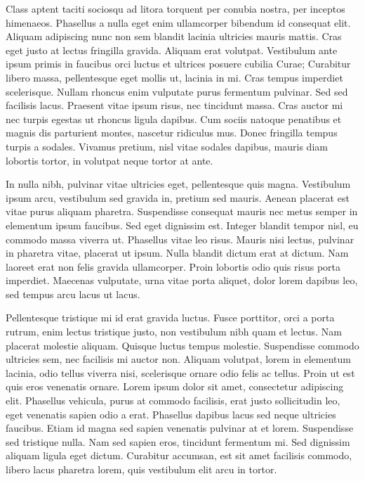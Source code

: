 Class aptent taciti sociosqu ad litora torquent per conubia nostra, per inceptos himenaeos. Phasellus a nulla eget enim ullamcorper bibendum id consequat elit. Aliquam adipiscing nunc non sem blandit lacinia ultricies mauris mattis. Cras eget justo at lectus fringilla gravida. Aliquam erat volutpat. Vestibulum ante ipsum primis in faucibus orci luctus et ultrices posuere cubilia Curae; Curabitur libero massa, pellentesque eget mollis ut, lacinia in mi. Cras tempus imperdiet scelerisque. Nullam rhoncus enim vulputate purus fermentum pulvinar. Sed sed facilisis lacus. Praesent vitae ipsum risus, nec tincidunt massa. Cras auctor mi nec turpis egestas ut rhoncus ligula dapibus. Cum sociis natoque penatibus et magnis dis parturient montes, nascetur ridiculus mus. Donec fringilla tempus turpis a sodales. Vivamus pretium, nisl vitae sodales dapibus, mauris diam lobortis tortor, in volutpat neque tortor at ante.

In nulla nibh, pulvinar vitae ultricies eget, pellentesque quis magna. Vestibulum ipsum arcu, vestibulum sed gravida in, pretium sed mauris. Aenean placerat est vitae purus aliquam pharetra. Suspendisse consequat mauris nec metus semper in elementum ipsum faucibus. Sed eget dignissim est. Integer blandit tempor nisl, eu commodo massa viverra ut. Phasellus vitae leo risus. Mauris nisi lectus, pulvinar in pharetra vitae, placerat ut ipsum. Nulla blandit dictum erat at dictum. Nam laoreet erat non felis gravida ullamcorper. Proin lobortis odio quis risus porta imperdiet. Maecenas vulputate, urna vitae porta aliquet, dolor lorem dapibus leo, sed tempus arcu lacus ut lacus.

Pellentesque tristique mi id erat gravida luctus. Fusce porttitor, orci a porta rutrum, enim lectus tristique justo, non vestibulum nibh quam et lectus. Nam placerat molestie aliquam. Quisque luctus tempus molestie. Suspendisse commodo ultricies sem, nec facilisis mi auctor non. Aliquam volutpat, lorem in elementum lacinia, odio tellus viverra nisi, scelerisque ornare odio felis ac tellus. Proin ut est quis eros venenatis ornare. Lorem ipsum dolor sit amet, consectetur adipiscing elit. Phasellus vehicula, purus at commodo facilisis, erat justo sollicitudin leo, eget venenatis sapien odio a erat. Phasellus dapibus lacus sed neque ultricies faucibus. Etiam id magna sed sapien venenatis pulvinar at et lorem. Suspendisse sed tristique nulla. Nam sed sapien eros, tincidunt fermentum mi. Sed dignissim aliquam ligula eget dictum. Curabitur accumsan, est sit amet facilisis commodo, libero lacus pharetra lorem, quis vestibulum elit arcu in tortor.

